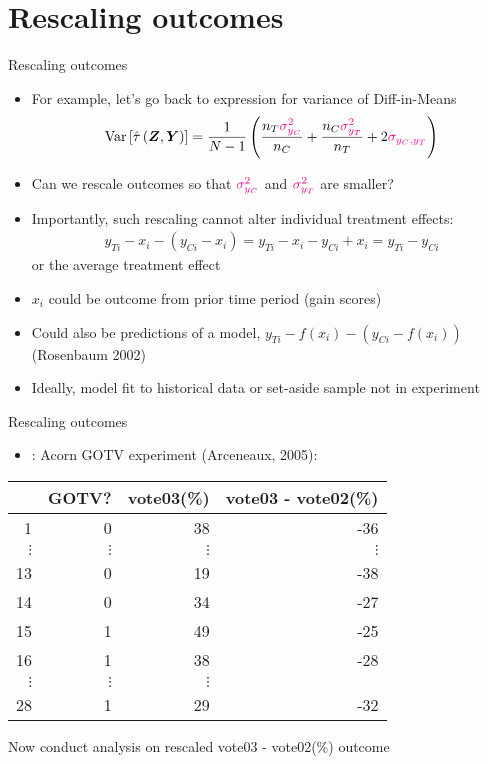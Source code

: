 \documentclass[table, xcolor = {dvipsnames}, 9pt]{beamer}
\theoremstyle{plain}
\newcommand{\bh}[1]{{\color{blue}{#1}}}
\newcommand{\mh}[1]{{\color{magenta}{#1}}}
\DeclareMathOperator{\Var}{\rm{Var}}
\begin{document}
\section{Rescaling outcomes}
\begin{frame}{Rescaling outcomes}
\vfill
\begin{itemize} \vfill
\item For example, let's go back to expression for variance of Diff-in-Means \vfill
\begin{equation*}
\Var\left[\hat{\tau}\left(\bm{Z}, \bm{Y}\right)\right] = \frac{1}{N - 1}\left(\frac{n_T \mh{\sigma^2_{y_C}}}{n_C} + \frac{n_C \mh{\sigma^2_{y_T}}}{n_T} + 2\mh{\sigma_{y_C, y_T}}\right)
\end{equation*} \vfill
\item Can we rescale outcomes so that $\mh{\sigma^2_{y_C}}$ and $\mh{\sigma^2_{y_T}}$ are smaller? \pause \vfill
\item Importantly, such rescaling cannot alter individual treatment effects: 
\begin{align*}
y_{Ti} - x_i - \left(y_{Ci} - x_i\right) = y_{Ti} - x_i - y_{Ci} + x_i = y_{Ti} - y_{Ci}
\end{align*}
or the average treatment effect \pause \vfill
\item $x_i$ could be outcome from prior time period (gain scores) \vfill
\item Could also be predictions of a model, $y_{Ti} - f(x_i) - \left(y_{Ci} - f(x_i)\right)$ (Rosenbaum 2002) \vfill
\item Ideally, model fit to historical data or set-aside sample not in experiment \vfill
\end{itemize} \vfill
\end{frame}
\begin{frame}{Rescaling outcomes}
\vfill
\begin{itemize} \vfill
\item \bh{Example}: Acorn GOTV experiment (Arceneaux, 2005):
\end{itemize} 
\begin{center}
  \begin{tabular}{r|rrr}
  \hline
 & GOTV? & vote03(\%) & vote03 - vote02(\%) \\
  \hline
1 & 0 & 38 & -36 \\
$\vdots$& $\vdots$& $\vdots$ & $\vdots$ \\
13 & 0 & 19 & -38 \\
14 & 0 & 34 & -27 \\
15 & 1 & 49 & -25 \\
16 & 1 & 38 & -28 \\
$\vdots$& $\vdots$& $\vdots$ & \\
28 & 1 & 29 & -32\\
   \hline
\end{tabular}
\end{center} \vfill
Now conduct analysis on rescaled vote03 - vote02(\%) outcome
\end{frame}
\end{document}
